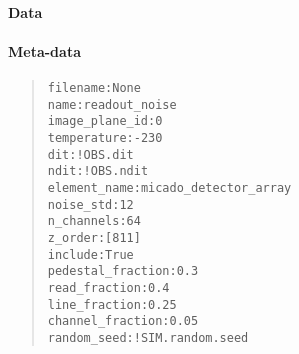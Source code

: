 \paragraph{Data%
  \label{id13}%
}


\paragraph{Meta-data%
  \label{id14}%
}

\begin{quote}
\begin{alltt}
         filename : None
             name : readout_noise
   image_plane_id : 0
      temperature : -230
              dit : !OBS.dit
             ndit : !OBS.ndit
     element_name : micado_detector_array
        noise_std : 12
       n_channels : 64
          z_order : [811]
          include : True
pedestal_fraction : 0.3
    read_fraction : 0.4
    line_fraction : 0.25
 channel_fraction : 0.05
      random_seed : !SIM.random.seed
\end{alltt}
\end{quote}
